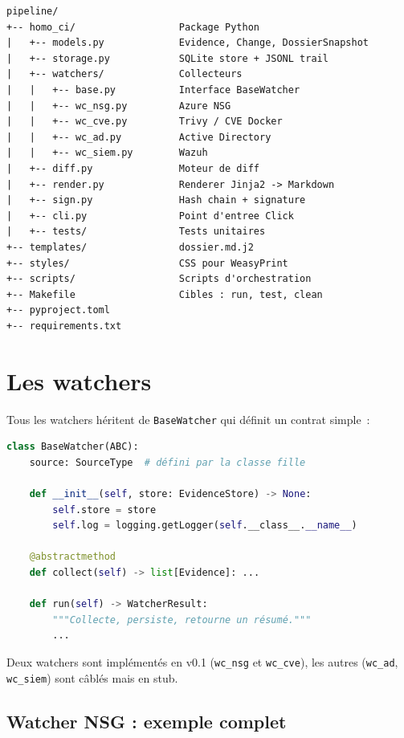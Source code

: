 \begin{lstlisting}[caption={Arborescence du paquet
\texttt{homo\_ci}.}]
pipeline/
+-- homo_ci/                  Package Python
|   +-- models.py             Evidence, Change, DossierSnapshot
|   +-- storage.py            SQLite store + JSONL trail
|   +-- watchers/             Collecteurs
|   |   +-- base.py           Interface BaseWatcher
|   |   +-- wc_nsg.py         Azure NSG
|   |   +-- wc_cve.py         Trivy / CVE Docker
|   |   +-- wc_ad.py          Active Directory
|   |   +-- wc_siem.py        Wazuh
|   +-- diff.py               Moteur de diff
|   +-- render.py             Renderer Jinja2 -> Markdown
|   +-- sign.py               Hash chain + signature
|   +-- cli.py                Point d'entree Click
|   +-- tests/                Tests unitaires
+-- templates/                dossier.md.j2
+-- styles/                   CSS pour WeasyPrint
+-- scripts/                  Scripts d'orchestration
+-- Makefile                  Cibles : run, test, clean
+-- pyproject.toml
+-- requirements.txt
\end{lstlisting}

\section{Les watchers}

Tous les watchers héritent de \texttt{BaseWatcher} qui définit un
contrat simple~:

\begin{lstlisting}[language=Python,caption={Interface
\texttt{BaseWatcher}.}]
class BaseWatcher(ABC):
    source: SourceType  # défini par la classe fille

    def __init__(self, store: EvidenceStore) -> None:
        self.store = store
        self.log = logging.getLogger(self.__class__.__name__)

    @abstractmethod
    def collect(self) -> list[Evidence]: ...

    def run(self) -> WatcherResult:
        """Collecte, persiste, retourne un résumé."""
        ...
\end{lstlisting}

Deux watchers sont implémentés en v0.1 (\texttt{wc\_nsg} et
\texttt{wc\_cve}), les autres (\texttt{wc\_ad}, \texttt{wc\_siem})
sont câblés mais en stub.

\subsection{Watcher NSG : exemple complet}

